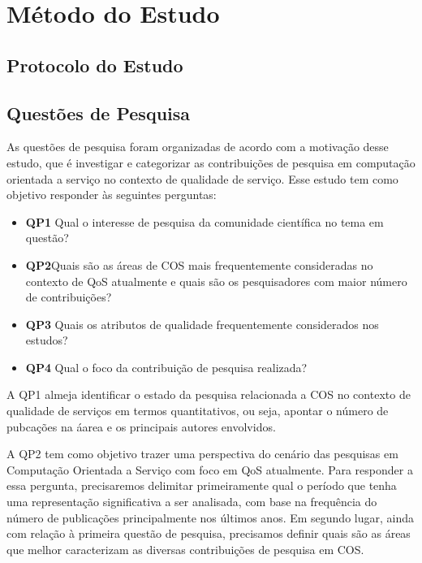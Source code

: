 
\section{M\'{e}todo do Estudo}\label{sec:review_method}

\subsection{Protocolo do Estudo}

\subsection{Quest\~{o}es de Pesquisa}

As quest\~{o}es de pesquisa foram organizadas de acordo com a motiva\c{c}\~{a}o desse estudo, que \'{e} investigar e categorizar as contribui\c{c}\~{o}es de pesquisa em computa\c{c}\~{a}o orientada a servi\c{c}o no contexto de qualidade de servi\c{c}o. Esse estudo tem como objetivo responder \`{a}s seguintes perguntas: 

\begin{itemize}
\item {\bf QP1} Qual o interesse de pesquisa da comunidade cient\'{i}fica no tema em quest\~{a}o? 
\item {\bf QP2}Quais s\~{a}o as \'{a}reas de COS mais frequentemente consideradas no contexto de QoS atualmente e quais s\~{a}o os pesquisadores com maior n\'{u}mero de contribui\c{c}\~{o}es?
\item {\bf QP3} Quais os atributos de qualidade frequentemente considerados nos estudos?
\item {\bf QP4} Qual o foco da contribui\c{c}\~{a}o de pesquisa realizada?   
\end{itemize}

A QP1 almeja identificar o estado da pesquisa relacionada a COS no contexto de qualidade de servi\c{c}os em termos quantitativos, ou seja, apontar o n\'{u}mero de pubca\c{c}\~{o}es na \'{a}area e os principais autores envolvidos.

A QP2 tem como objetivo trazer uma perspectiva do cen\'{a}rio das pesquisas em Computa\c{c}\~{a}o Orientada a Servi\c{c}o com foco em QoS atualmente. Para responder a essa pergunta, precisaremos delimitar primeiramente qual o per\'{i}odo que tenha uma representa\c{c}\~{a}o significativa a ser analisada, com base na frequ\^{e}ncia do n\'{u}mero de publica\c{c}\~{o}es principalmente nos \'{u}ltimos anos. Em segundo lugar, ainda com rela\c{c}\~{a}o \`{a} primeira quest\~{a}o de pesquisa, precisamos definir quais s\~{a}o as \'{a}reas que melhor caracterizam as diversas contribui\c{c}\~{o}es de pesquisa em COS. 

